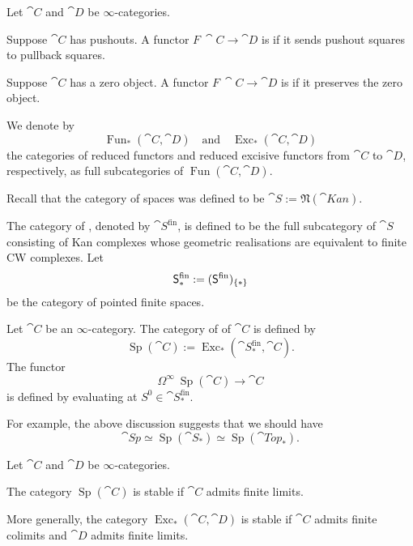 \begin{definition}
    Let $\cat{C}$ and $\cat{D}$ be $\infty$-categories.
    \begin{itms}
        \item Suppose $\cat{C}$ has pushouts.
        A functor $F\:\cat{C}\to\cat{D}$ is 
        if it sends pushout squares to pullback squares.
        \item Suppose $\cat{C}$ has a zero object.
        A functor $F\:\cat{C}\to\cat{D}$ is 
        if it preserves the zero object.
    \end{itms}
    We denote by 
    \[\operatorname{Fun}_*(\cat{C},\cat{D})\quad\text{and}\quad
    \operatorname{Exc}_*(\cat{C},\cat{D})\]
    the categories of reduced functors and reduced excisive functors 
    from $\cat{C}$ to $\cat{D}$, respectively,
    as full subcategories of $\operatorname{Fun}(\cat{C},\cat{D})$.
\end{definition}

Recall that the category of spaces was defined to be
$\cat{S}:=\mathfrak{N}(\cat{Kan})$.

\begin{definition}
    The category of , denoted by $\cat{S}^{\mathrm{fin}}$,
    is defined to be the full subcategory of $\cat{S}$
    consisting of Kan complexes whose geometric realisations
    are equivalent to finite CW complexes. Let
    \[\mathsf{S}_*^{\mathrm{fin}}:=(\mathsf{S}^{\mathrm{fin}})_{\{*\}\/}\]
    be the category of pointed finite spaces.
\end{definition}

\begin{definition}
    Let $\cat{C}$ be an $\infty$-category.
    The category of  of $\cat{C}$
    is defined by 
    \[\operatorname{Sp}(\cat{C}):=
    \operatorname{Exc}_*(\cat{S}_*^{\mathrm{fin}},\cat{C}).\]
    The functor 
    \[\Omega^\infty\:\operatorname{Sp}(\cat{C})\to\cat{C}\]
    is defined by evaluating at $S^0\in\cat{S}_*^{\mathrm{fin}}$.
\end{definition}

For example, the above discussion suggests that we should have
\[\cat{Sp}\simeq\operatorname{Sp}(\cat{S}_*)\simeq\operatorname{Sp}(\cat{Top}_*).\]

\begin{proposition}
    Let $\cat{C}$ and $\cat{D}$ be $\infty$-categories.

    \begin{itms}
        \item
        The category $\operatorname{Sp}(\cat{C})$ is stable
        if $\cat{C}$ admits finite limits.

        \item
        More generally, the category $\operatorname{Exc}_*(\cat{C},\cat{D})$
        is stable if $\cat{C}$ admits finite colimits and 
        $\cat{D}$ admits finite limits.
    \end{itms}
\end{proposition}

